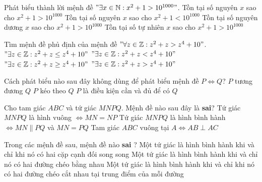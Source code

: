 \begin{ex}%
	Phát biểu thành lời mệnh đề $"\exists x \in \mathbb{N} :  x^2 +1 >10^{1000}"$. 
	\choice 
	{Tồn tại số nguyên $x$ sao cho $x^2 +1 >10^{1000}$}
	{Tồn tại số nguyên $x$ sao cho $x^2+1 < 10^{1000}$}
	{Tồn tại số nguyên dương $x$ sao cho $x^2 +1 >10^{1000}$}
	{\True Tồn tại số tự nhiên $x$ sao cho $ x^2 +1 >10^{1000}$}
\end{ex}

\begin{ex}%
	Tìm mệnh đề phủ định của mệnh đề $"\forall z \in \mathbb{Z} : z^2+z > z^4+10"$.
	\choice 
	{\True $"\exists z \in \mathbb{Z} : z^2+z \leq  z^4+10"$}
	{$"\exists z \in \mathbb{Z} : z^2+z <  z^4+10"$}
	{$"\exists z \in \mathbb{Z} : z^2+z \geq  z^4+10"$}
	{$"\exists z \in \mathbb{Z} : z^2+z >  z^4+10"$}
\end{ex}

\begin{ex}%
	Cách phát biểu nào sau đây không dùng để phát biểu mệnh đề $P \Leftrightarrow Q$?
	{$P$ tương đương $Q$}
	{\True $P$ kéo theo $Q$}
	{$P$ là điều kiện cần và đủ để có $Q$}
\end{ex}

\begin{ex}%
	Cho tam giác $ABC$ và tứ giác $MNPQ.$ Mệnh đề nào sau đây là {\bf sai}?
	{\True Tứ giác $MNPQ$ là hình vuông $\Leftrightarrow MN=NP$}
	{Tứ giác $MNPQ$ là hình bình hành $\Leftrightarrow MN\parallel PQ$ và $MN=PQ$}
	{Tam giác $ABC$ vuông tại $A\Leftrightarrow AB\perp AC$ }
\end{ex}

\begin{ex}%
	Trong các mệnh đề sau, mệnh đề nào {\bf sai} ?
	{Một tứ giác là hình bình hành khi và chỉ khi nó có hai cặp cạnh đối song song}
	{\True Một tứ giác là hình bình hành khi và chỉ nó có hai đường chéo bằng nhau}
	{Một tứ giác là hình bình hành khi và chỉ khi nó có hai đường chéo cắt nhau tại trung điểm của mỗi đường}
\end{ex}

